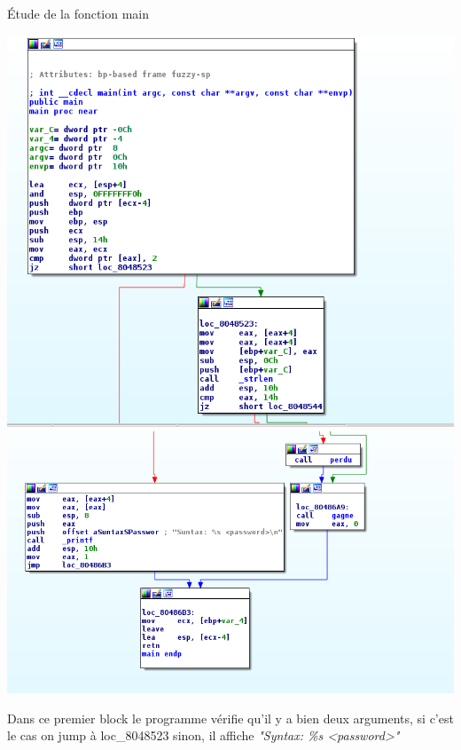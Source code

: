 \documentclass[10pt,sans,usenames,dvipsnames,french,compress]{beamer}
\begin{document}
	
\begin{frame}[fragile]{Étude de la fonction main}

	  \begin{center}
			\includegraphics[width=0.5\linewidth]{114/main.png}
			\includegraphics[width=0.5\linewidth]{114/syntax.png}
		\end{center}
			\begin{block}{}
			Dans ce premier block le programme vérifie qu'il y a bien deux arguments, si c'est le cas on jump à loc\_8048523 sinon, il affiche \textit{"Syntax: \%s <password>"}
\end{block}

\end{frame}	
\end{document}
